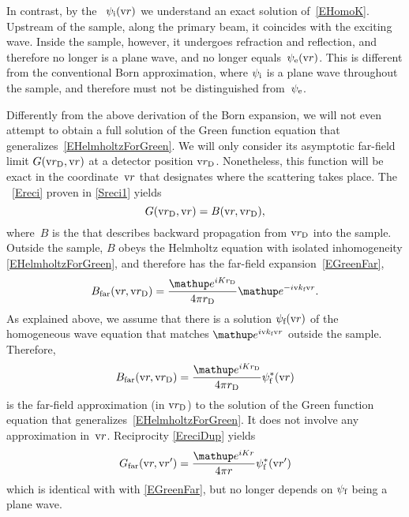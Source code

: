 In contrast, by the ~$\psi_\si(\r)$
%
%
%
we understand an exact solution of~\cref{EHomoK}.
Upstream of the sample, along the primary beam, it coincides with the exciting wave.
Inside the sample, however, it undergoes refraction and reflection,
and therefore no longer is a plane wave, and no longer equals~$\psi_\se(\r)$.
This is different from the conventional Born approximation,
where $\psi_\si$ is a plane wave throughout the sample,
and therefore must not be distinguished from~$\psi_\se$.

Differently from the above derivation of the Born expansion,
we will not even attempt to obtain a full solution
%
of the Green function equation that generalizes~\cref{EHelmholtzForGreen}.
We will only consider its asymptotic far-field limit $G(\rD,\r)$
at a detector position $\rD$.
Nonetheless, this function will be exact in the coordinate~$\r$
that designates where the scattering takes place.
%
The ~\cref{Ereci}
%
proven in \cref{Sreci1}
yields
\begin{equation}\label{EreciDup}
  G(\rD,\r) = B(\r,\rD),
\end{equation}
%
where~$B$ is the 
that describes backward propagation from $\rD$ into the sample.
Outside the sample,
$B$ obeys the Helmholtz equation
with isolated inhomogeneity \cref{EHelmholtzForGreen},
and therefore has the far-field expansion~\cref{EGreenFar},
%
\begin{equation}\label{EBFar}
  B_\text{far}(\r,\rD)
  =\frac{\e^{iKr_\text{D}}}{4\pi r_\text{D}}\e^{-i\k_\sf \r}.
\end{equation}
As explained above,
we assume that there is a solution $\psi_\sf(\r)$ of the homogeneous
wave equation that matches $\e^{i\k_\sf \r}$ outside the sample.
Therefore,
\begin{equation}\label{EBFull}
  B_\text{far}(\r,\rD)
  = \frac{\e^{iKr_\text{D}}}{4\pi r_\text{D}}\psi^*_\sf(\r)
\end{equation}
is the far-field approximation (in $\rD$)
to the solution of the Green function equation that generalizes~\cref{EHelmholtzForGreen}.
It does not involve any approximation in~$\r$.
Reciprocity \cref{EreciDup} yields
\begin{equation}\label{EGreenFarDWBA}
  G_\text{far}(\r,\r')
  = \frac{\e^{iKr}}{4\pi r}\psi^*_\sf(\r')
\end{equation}
which is identical with with \cref{EGreenFar},
but no longer depends on $\psi_\sf$ being a plane wave.

